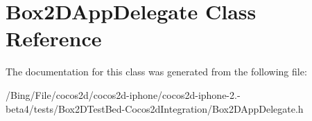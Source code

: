 \hypertarget{interface_box2_d_app_delegate}{\section{Box2\-D\-App\-Delegate Class Reference}
\label{interface_box2_d_app_delegate}
}


The documentation for this class was generated from the following file\-:\begin{DoxyCompactItemize}
\item 
/\-Bing/\-File/cocos2d/cocos2d-\/iphone/cocos2d-\/iphone-\/2.-\/beta4/tests/\-Box2\-D\-Test\-Bed-\/\-Cocos2d\-Integration/Box2\-D\-App\-Delegate.\-h\end{DoxyCompactItemize}
